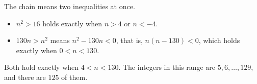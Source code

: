 The chain means two inequalities at once.
\begin{itemize}
\item $n^2>16$ holds exactly when $n>4$ or $n<-4$.
\item $130n>n^2$ means $n^2-130n<0$, that is, $n(n-130)<0$, which holds exactly when $0<n<130$.
\end{itemize}
Both hold exactly when $\boxed{4<n<130}$. The integers in this range are $5,6,\dots,129$, and there are $\boxed{125}$ of them.
